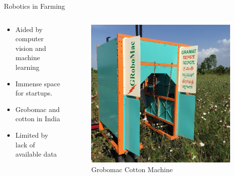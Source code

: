\documentclass[presentation]{beamer}
\begin{document}
\begin{frame}[label={sec:org76ddac2}]{Robotics in Farming}
\begin{columns}
\begin{column}{0.5\columnwidth}
\begin{itemize}
\item Aided by computer vision and machine learning
\item Immense space for startups.
\item Grobomac and cotton in India
\item Limited by lack of available data
\end{itemize}
\end{column}
\begin{column}{0.5\columnwidth}
\begin{figure}[htbp]
\centering
\includegraphics[width=.9\linewidth]{./images/grobomac.png}
\caption{Grobomac Cotton Machine}
\end{figure}
\end{column}
\end{columns}
\end{frame}
\end{document}
